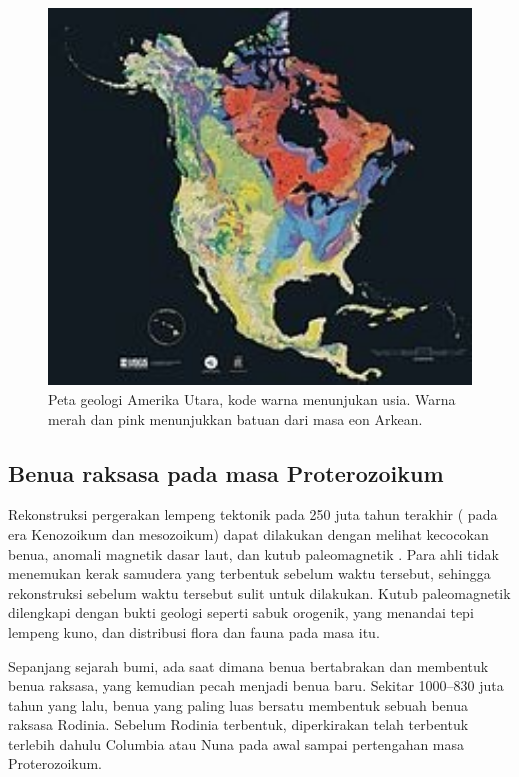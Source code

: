 \begin{figure}[ht]
    \centerline{\includegraphics[width=1\textwidth]{figures/PetaAmerikaUtara.JPG}}
    \caption{Peta geologi Amerika Utara, kode warna menunjukan usia. Warna merah dan pink menunjukkan batuan dari masa eon Arkean.}
    \label{PetaAmerikaUtara}
    \end{figure}


\subsection{Benua raksasa pada masa Proterozoikum} 
Rekonstruksi pergerakan lempeng tektonik pada 250 juta tahun terakhir ( pada era Kenozoikum dan mesozoikum) dapat dilakukan dengan melihat kecocokan benua, anomali magnetik dasar laut, dan kutub paleomagnetik \cite{suryasejarah}. Para ahli tidak menemukan kerak samudera yang terbentuk sebelum waktu tersebut, sehingga rekonstruksi sebelum waktu tersebut sulit untuk dilakukan. Kutub paleomagnetik dilengkapi dengan bukti geologi seperti sabuk orogenik, yang menandai tepi lempeng kuno, dan distribusi flora dan fauna pada masa itu.

Sepanjang sejarah bumi, ada saat dimana benua bertabrakan dan membentuk benua raksasa, yang kemudian pecah menjadi benua baru. Sekitar 1000–830 juta tahun yang lalu, benua yang paling luas bersatu membentuk sebuah benua raksasa Rodinia. Sebelum Rodinia terbentuk, diperkirakan telah terbentuk terlebih dahulu Columbia atau Nuna pada awal sampai pertengahan masa Proterozoikum.

